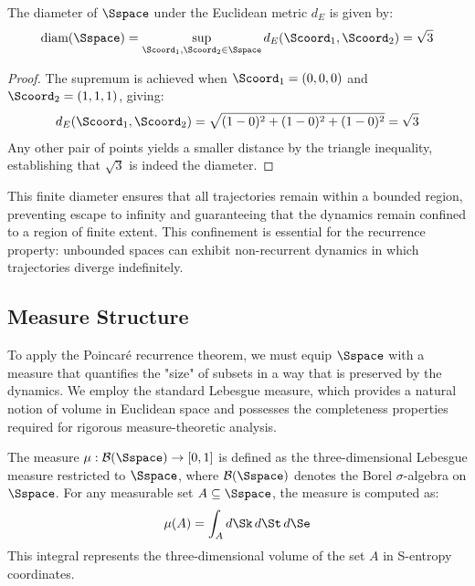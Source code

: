 \begin{proposition}
\label{prop:diameter}
The diameter of $\Sspace$ under the Euclidean metric $d_E$ is given by:
\begin{equation}
\text{diam}(\Sspace) = \sup_{\Scoord_1, \Scoord_2 \in \Sspace} d_E(\Scoord_1, \Scoord_2) = \sqrt{3}
\label{eq:diameter}
\end{equation}
\end{proposition}

\begin{proof}
The supremum is achieved when $\Scoord_1 = (0,0,0)$ and $\Scoord_2 = (1,1,1)$, giving:
\begin{equation}
d_E(\Scoord_1, \Scoord_2) = \sqrt{(1-0)^2 + (1-0)^2 + (1-0)^2} = \sqrt{3}
\end{equation}
Any other pair of points yields a smaller distance by the triangle inequality, establishing that $\sqrt{3}$ is indeed the diameter.
\end{proof}

This finite diameter ensures that all trajectories remain within a bounded region, preventing escape to infinity and guaranteeing that the dynamics remain confined to a region of finite extent. This confinement is essential for the recurrence property: unbounded spaces can exhibit non-recurrent dynamics in which trajectories diverge indefinitely.

\subsection{Measure Structure}

To apply the Poincaré recurrence theorem, we must equip $\Sspace$ with a measure that quantifies the "size" of subsets in a way that is preserved by the dynamics. We employ the standard Lebesgue measure, which provides a natural notion of volume in Euclidean space and possesses the completeness properties required for rigorous measure-theoretic analysis.

\begin{definition}
\label{def:lebesgue_measure}
The measure $\mu: \mathcal{B}(\Sspace) \to [0,1]$ is defined as the three-dimensional Lebesgue measure restricted to $\Sspace$, where $\mathcal{B}(\Sspace)$ denotes the Borel $\sigma$-algebra on $\Sspace$. For any measurable set $A \subseteq \Sspace$, the measure is computed as:
\begin{equation}
\mu(A) = \int_A d\Sk \, d\St \, d\Se
\label{eq:measure_integral}
\end{equation}
This integral represents the three-dimensional volume of the set $A$ in S-entropy coordinates.
\end{definition}

